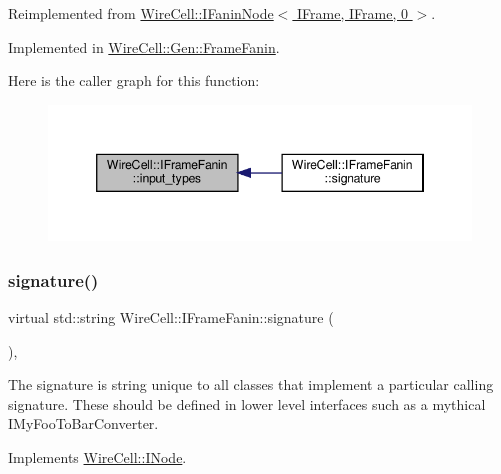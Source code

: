 Reimplemented from \hyperlink{class_wire_cell_1_1_i_fanin_node_a102c43a647e2e0070e329c397e27c2f5}{Wire\+Cell\+::\+I\+Fanin\+Node$<$ I\+Frame, I\+Frame, 0 $>$}.



Implemented in \hyperlink{class_wire_cell_1_1_gen_1_1_frame_fanin_aeba173a6fd84de2b655fe56fd41d8c05}{Wire\+Cell\+::\+Gen\+::\+Frame\+Fanin}.

Here is the caller graph for this function\+:
\nopagebreak
\begin{figure}[H]
\begin{center}
\leavevmode
\includegraphics[width=346pt]{class_wire_cell_1_1_i_frame_fanin_a7c19800cac1dc1bf67199b067811f500_icgraph}
\end{center}
\end{figure}
\mbox{\label{class_wire_cell_1_1_i_frame_fanin_aebfb010bd1a132b11af4c25785e779bb}} 
\subsubsection{\texorpdfstring{signature()}{signature()}}
{\footnotesize\ttfamily virtual std\+::string Wire\+Cell\+::\+I\+Frame\+Fanin\+::signature (\begin{DoxyParamCaption}{ }\end{DoxyParamCaption})\hspace{0.3cm}{\ttfamily [inline]}, {\ttfamily [virtual]}}

The signature is string unique to all classes that implement a particular calling signature. These should be defined in lower level interfaces such as a mythical I\+My\+Foo\+To\+Bar\+Converter. 

Implements \hyperlink{class_wire_cell_1_1_i_node_a0b0763465adf5ba7febe8e378162b584}{Wire\+Cell\+::\+I\+Node}.



